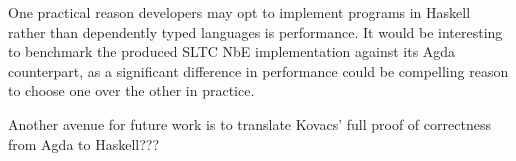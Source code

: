 
One practical reason developers may opt to implement programs in Haskell rather than dependently typed languages is performance. It would be interesting to benchmark the produced SLTC NbE implementation against its Agda counterpart, as a significant difference in performance could be compelling reason to choose one over the other in practice.

Another avenue for future work is to translate Kovacs' full proof of correctness from Agda to Haskell???

